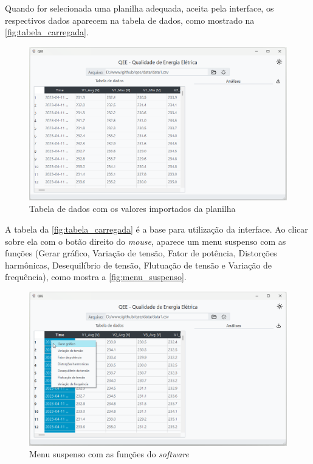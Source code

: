 Quando for selecionada uma planilha adequada, aceita pela interface, os respectivos dados aparecem na tabela de dados, como mostrado na \autoref{fig:tabela_carregada}.

\begin{figure}[H]
  \centering
  \caption{Tabela de dados com os valores importados da planilha}
  \label{fig:tabela_carregada}
  \includegraphics[width=15cm]{illustrations/figures/tabela_carregada.png}
\end{figure}

A tabela da \autoref{fig:tabela_carregada} é a base para utilização da interface. Ao clicar sobre ela com o botão direito do \textit{mouse}, aparece um menu suspenso com as funções (Gerar gráfico, Variação de tensão, Fator de potência, Distorções harmônicas, Desequilíbrio de tensão, Flutuação de tensão e Variação de frequência), como mostra a \autoref{fig:menu_suspenso}.

\begin{figure}[H]
  \centering
  \caption{Menu suspenso com as funções do \textit{software}}
  \label{fig:menu_suspenso}
  \includegraphics[width=15cm]{illustrations/figures/menu_suspenso.png}
\end{figure}

